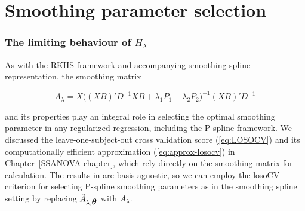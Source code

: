 

\section{Smoothing parameter selection}

%
\subsubsection{The limiting behaviour of $H_\lambda$}

As with the RKHS framework and accompanying smoothing spline representation, the smoothing matrix  

\begin{equation}\label{eq:pspline-smoothing-matrix}
A_\lambda = X \big( \left(X B\right)' D^{-1} XB +  \lambda_1 P_1+ \lambda_2 P_2 \big)^{-1}\left(X B\right)' D^{-1}
\end{equation}

\noindent
and its properties play an integral role in selecting the optimal smoothing parameter in any regularized regression, including the P-spline framework. We discussed the leave-one-subject-out cross validation score (\ref{eq:LOSOCV}) and its computationally efficient approximation (\ref{eq:approx-losocv}) in Chapter~\ref{SSANOVA-chapter}, which rely directly on the smoothing matrix for calculation. The results in \cite{xu2012asymptotic} are basis agnostic, so we can employ the losoCV criterion for selecting P-spline smoothing parameters as in the smoothing spline setting by replacing $\tilde{A}_{\lambda,\mbox{\boldmath $\theta$}}$ with $A_\lambda$. 

